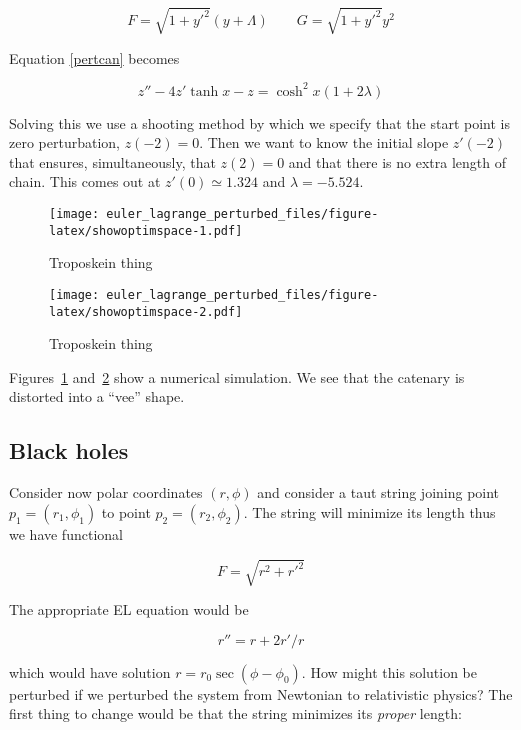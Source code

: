 \documentclass[pdflatex,sn-mathphys-num]{sn-jnl}%
\theoremstyle{thmstyleone}%
\theoremstyle{thmstyletwo}%
\theoremstyle{thmstylethree}%
\begin{document}
\begin{equation}
  F = \sqrt{1+y'^2}(y+\Lambda)\qquad
  G = \sqrt{1+y'^2}y^2
\end{equation}

Equation \ref{pertcan} becomes

\begin{equation}
  z'' - 4z'\tanh x - z = \cosh^2 x(1+2\lambda)
\end{equation}

Solving this we use a shooting method by which we specify that the
start point is zero perturbation, $z(-2)=0$.  Then we want to know the
initial slope $z'(-2)$ that ensures, simultaneously, that $z(2)=0$ and
that there is no extra length of chain.  This comes out at
$z'(0)\simeq 1.324$ and $\lambda = -5.524$.


\begin{figure}[h]
\centering
\texttt{[image: euler\_lagrange\_perturbed\_files/figure-latex/showoptimspace-1.pdf]}
\caption{Troposkein thing}\label{space}
\end{figure}

\begin{figure}[h]
\centering
\texttt{[image: euler\_lagrange\_perturbed\_files/figure-latex/showoptimspace-2.pdf]}
\caption{Troposkein thing}\label{space2}
\end{figure}

Figures~\ref{space} and~\ref{space2} show a numerical simulation.  We
see that the catenary is distorted into a ``vee'' shape.


\subsection{Black holes}

Consider now polar coordinates $(r,\phi)$ and consider a taut string
joining point $p_1=(r_1,\phi_1)$ to point $p_2=(r_2,\phi_2)$.  The
string will minimize its length thus we have  functional

\begin{equation}
  F=\sqrt{r^2 + r'^2}
\end{equation}

The appropriate EL equation would be

\begin{equation}
r'' = r + 2r'/r
\end{equation}

which would have solution $r=r_0\sec(\phi-\phi_0)$.  How might this
solution be perturbed if we perturbed the system from Newtonian to
relativistic physics?  The first thing to change would be that the
string minimizes its {\em proper} length:
\end{document}
